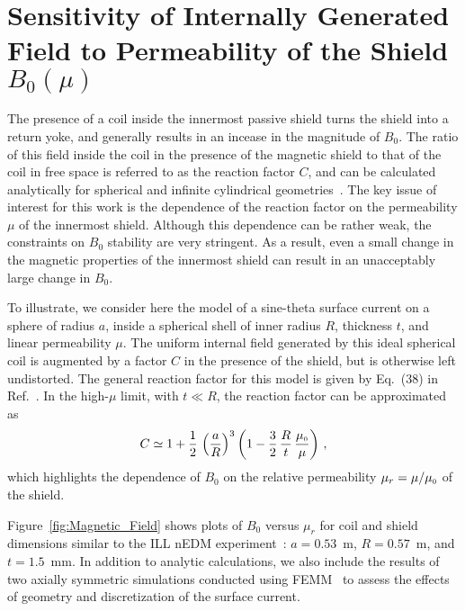 

\section{Sensitivity of Internally Generated Field to Permeability of the Shield $B_0(\mu)$\label{sec:calculation}}

The presence of a coil inside the innermost passive shield turns
 the shield into a return yoke, and generally results in an incease
 in the magnitude of $B_0$. %
 The ratio of this field inside the 
coil in the presence of the magnetic shield to that of the coil in
free space is referred to as the reaction factor $C$, and can be calculated analytically
for spherical and infinite cylindrical geometries~\cite{bib:bidinostimartin,bib:urankar}. 
The key issue of interest for this work is the dependence of the
reaction factor on the permeability $\mu$ of the innermost shield.    Although this
dependence can be rather weak, the constraints on $B_0$ stability are very stringent.
As a result, even a small change in the magnetic properties of the innermost shield
can result in an unacceptably large change in $B_0$.


To illustrate, we consider here the model of a sine-theta surface current on a sphere of radius $a$, inside a spherical shell of inner radius $R$, thickness $t$, and linear permeability $\mu$.  
%
The uniform internal field generated by this ideal spherical coil is augmented by a factor $C$ in the presence of the shield, but is otherwise left undistorted.  The general  reaction factor for this model is given by Eq.~(38) in Ref.~\cite{bib:bidinostimartin}.  In the high-$\mu$ limit, with $t\ll R$,  the reaction factor can be approximated as
%
\begin{equation}
C 
 \simeq 1+ \frac{1}{2}\, \left( \frac{a}{R} \right)^{3} \left( 1- \frac{3}{2} \, \frac{R}{t} \, \frac{\mu_{\scriptscriptstyle 0}}{\mu} \right) \, ,
 \label{Csphere}
\end{equation}
which highlights the dependence of $B_0$ on the relative permeability $\mu_r=\mu/\mu_{\scriptscriptstyle 0}$ of the shield. 



Figure~\ref{fig:Magnetic_Field} shows plots of $B_0$ versus $\mu_r$ for coil and shield dimensions
similar to the ILL nEDM experiment~\cite{bib:baker,bib:knecht}:  $a=0.53$~m, $R= 0.57$~m, and  $t=1.5$~mm.
In addition to analytic calculations, we also include the results of
two axially symmetric simulations conducted using FEMM~\cite{bib:femm}
  to assess the effects of geometry and discretization of the surface current.

